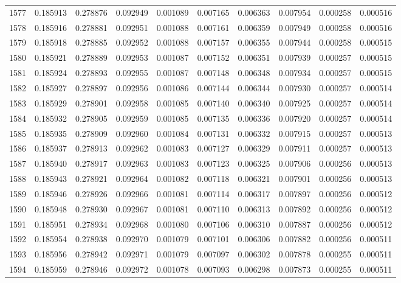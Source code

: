 \begin{tabular}{lrrrrrrrrr}
1577 & 0.185913 & 0.278876 & 0.092949 & 0.001089 & 0.007165 & 0.006363 & 0.007954 & 0.000258 & 0.000516 \\
1578 & 0.185916 & 0.278881 & 0.092951 & 0.001088 & 0.007161 & 0.006359 & 0.007949 & 0.000258 & 0.000516 \\
1579 & 0.185918 & 0.278885 & 0.092952 & 0.001088 & 0.007157 & 0.006355 & 0.007944 & 0.000258 & 0.000515 \\
1580 & 0.185921 & 0.278889 & 0.092953 & 0.001087 & 0.007152 & 0.006351 & 0.007939 & 0.000257 & 0.000515 \\
1581 & 0.185924 & 0.278893 & 0.092955 & 0.001087 & 0.007148 & 0.006348 & 0.007934 & 0.000257 & 0.000515 \\
1582 & 0.185927 & 0.278897 & 0.092956 & 0.001086 & 0.007144 & 0.006344 & 0.007930 & 0.000257 & 0.000514 \\
1583 & 0.185929 & 0.278901 & 0.092958 & 0.001085 & 0.007140 & 0.006340 & 0.007925 & 0.000257 & 0.000514 \\
1584 & 0.185932 & 0.278905 & 0.092959 & 0.001085 & 0.007135 & 0.006336 & 0.007920 & 0.000257 & 0.000514 \\
1585 & 0.185935 & 0.278909 & 0.092960 & 0.001084 & 0.007131 & 0.006332 & 0.007915 & 0.000257 & 0.000513 \\
1586 & 0.185937 & 0.278913 & 0.092962 & 0.001083 & 0.007127 & 0.006329 & 0.007911 & 0.000257 & 0.000513 \\
1587 & 0.185940 & 0.278917 & 0.092963 & 0.001083 & 0.007123 & 0.006325 & 0.007906 & 0.000256 & 0.000513 \\
1588 & 0.185943 & 0.278921 & 0.092964 & 0.001082 & 0.007118 & 0.006321 & 0.007901 & 0.000256 & 0.000513 \\
1589 & 0.185946 & 0.278926 & 0.092966 & 0.001081 & 0.007114 & 0.006317 & 0.007897 & 0.000256 & 0.000512 \\
1590 & 0.185948 & 0.278930 & 0.092967 & 0.001081 & 0.007110 & 0.006313 & 0.007892 & 0.000256 & 0.000512 \\
1591 & 0.185951 & 0.278934 & 0.092968 & 0.001080 & 0.007106 & 0.006310 & 0.007887 & 0.000256 & 0.000512 \\
1592 & 0.185954 & 0.278938 & 0.092970 & 0.001079 & 0.007101 & 0.006306 & 0.007882 & 0.000256 & 0.000511 \\
1593 & 0.185956 & 0.278942 & 0.092971 & 0.001079 & 0.007097 & 0.006302 & 0.007878 & 0.000255 & 0.000511 \\
1594 & 0.185959 & 0.278946 & 0.092972 & 0.001078 & 0.007093 & 0.006298 & 0.007873 & 0.000255 & 0.000511 \\

\end{tabular}

